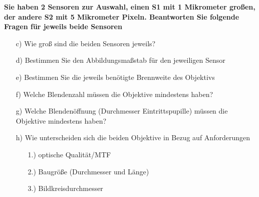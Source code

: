 \documentclass[a4paper]{article}
\begin{document}
	\textbf{Sie haben 2 Sensoren zur Auswahl, einen S1 mit 1 Mikrometer großen, der andere S2 mit 5 Mikrometer Pixeln. Beantworten Sie folgende Fragen für jeweils beide Sensoren}\\
	
	\begin{itemize}
		\item[c)] Wie groß sind die beiden Sensoren jeweils?
	\end{itemize}

	
	\begin{itemize}
		\item[d)] Bestimmen Sie den Abbildungsmaßstab für den jeweiligen Sensor
	\end{itemize}

	\begin{itemize}
	\item[e)] Bestimmen Sie die jeweils benötigte Brennweite des Objektivs
	\end{itemize}

	\begin{itemize}
	\item[f)] Welche Blendenzahl müssen die Objektive mindestens haben?
	\end{itemize}

	\begin{itemize}
	\item[g)] Welche Blendenöffnung (Durchmesser Eintrittspupille) müssen die Objektive mindestens
	haben?
	\end{itemize}

	\begin{itemize}
	\item[h)] Wie unterscheiden sich die beiden Objektive in Bezug auf Anforderungen
		\begin{itemize}
			\item[1.)] optische Qualität/MTF
			\item[2.)] Baugröße (Durchmesser und Länge)
			\item[3.)] Bildkreisdurchmesser
		\end{itemize}
	\end{itemize}
\end{document}
